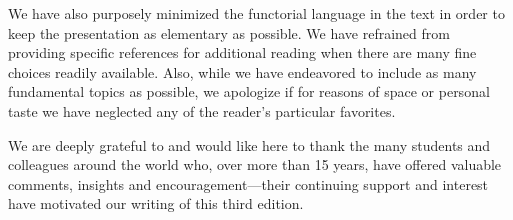   We have also purposely minimized the functorial language in the text in order to keep the presentation as elementary as possible. We have refrained from providing specific references for additional reading when there are many fine choices readily available. Also, while we have endeavored to include as many fundamental topics as possible, we apologize if for reasons of space or personal taste we have neglected any of the reader's particular favorites.

  We are deeply grateful to and would like here to thank the many students and colleagues around the world who, over more than 15 years, have offered valuable comments, insights and encouragement---their continuing support and interest have motivated our writing of this third edition.

  \pagebreak[no]
  \blank


\stopchapter
